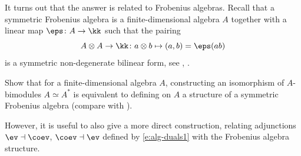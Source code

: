 It turns out that the answer is related to Frobenius algebras. Recall that a
symmetric Frobenius algebra is a finite-dimensional algebra $A$ together with a
linear map $\eps\colon A\to\kk$ such that the pairing
$$
  A\otimes A\to \kk\colon
  a\otimes b \mapsto (a,b)=\eps(ab)
$$
is a symmetric non-degenerate bilinear form, see ,
.




\begin{exercise}\label{ec:fd-algebra-separable}
  Show that for a finite-dimensional algebra $A$, constructing an isomorphism of
  $A$-bimodules $A\simeq A^*$ is equivalent to defining on $A$ a structure of
  a symmetric Frobenius algebra (compare with ).
\end{exercise}


However, it is useful to also give a more direct construction, relating
adjunctions $\ev\dashv\coev$, $\coev\dashv\ev$ defined by \eqref{e:alg-duals1}
with the Frobenius algebra structure.


